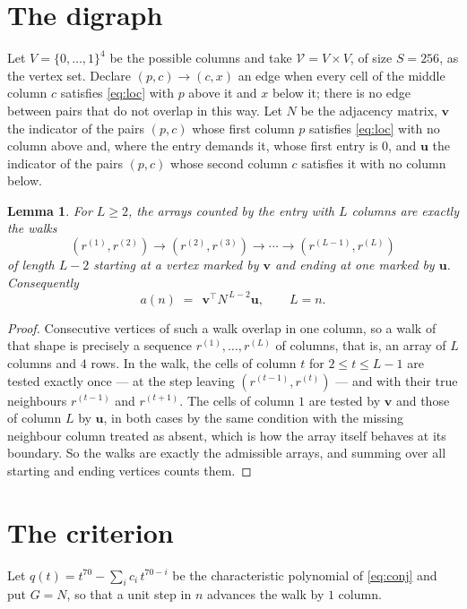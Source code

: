 \documentclass[11pt,a4paper]{article}
\theoremstyle{plain}
\newtheorem{lemma}[theorem]{Lemma}
\theoremstyle{definition}
\begin{document}
\section{The digraph}

Let $V=\{0,\dots,1\}^{4}$ be the possible columns and take
$\mathcal V=V\times V$, of size $S=256$, as the vertex set. Declare $(p,c)\to(c,x)$ an edge
when every cell of the middle column $c$ satisfies \eqref{eq:loc} with $p$ above it and $x$
below it; there is no edge between pairs that do not overlap in this way. Let $N$ be the
adjacency matrix, $\mathbf{v}$ the indicator of the pairs $(p,c)$ whose first column $p$
satisfies \eqref{eq:loc} with no column above and, where the entry demands it, whose first entry is $0$, and $\mathbf{u}$ the indicator of
the pairs $(p,c)$ whose second column $c$ satisfies it with no column below.

\begin{lemma}\label{lem:walk}
For $L\ge2$, the arrays counted by the entry with $L$ columns are exactly the walks
\[
(r^{(1)},r^{(2)})\to(r^{(2)},r^{(3)})\to\cdots\to(r^{(L-1)},r^{(L)})
\]
of length $L-2$ starting at a vertex marked by $\mathbf{v}$ and ending at one marked by
$\mathbf{u}$. Consequently
\[
a(n)\;=\;\,\mathbf{v}^{\!\top}N^{\,L-2}\mathbf{u},\qquad L=n .
\]
\end{lemma}

\begin{proof}
Consecutive vertices of such a walk overlap in one column, so a walk of that shape is
precisely a sequence $r^{(1)},\dots,r^{(L)}$ of columns, that is, an array of $L$ columns
and $4$ rows. In the walk, the cells of column $t$ for $2\le t\le L-1$ are tested
exactly once --- at the step leaving $(r^{(t-1)},r^{(t)})$ --- and with their true
neighbours $r^{(t-1)}$ and $r^{(t+1)}$. The cells of column $1$ are tested by
$\mathbf{v}$ and those of column $L$ by $\mathbf{u}$, in both cases by the same condition
with the missing neighbour column treated as absent, which is how the array itself behaves at
its boundary. So the walks are exactly the admissible arrays, and summing over all starting
and ending vertices counts them.
\end{proof}

\section{The criterion}

Let $q(t)=t^{70}-\sum_i c_i\,t^{70-i}$ be the characteristic polynomial of
\eqref{eq:conj} and put $G=N$, so that a unit step in $n$ advances the walk by
$1$ column.
\end{document}
